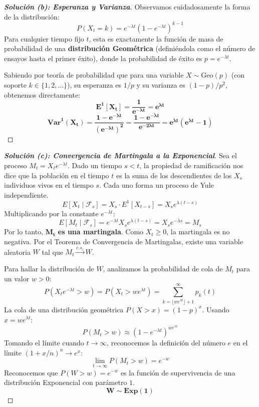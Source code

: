 \documentclass[10pt,a4paper]{article}
\begin{document}
\begin{proof}[\textbf{Solución (b): Esperanza y Varianza}]
    Observamos cuidadosamente la forma de la distribución:
    \[ P(X_t = k) = e^{-\lambda t}(1 - e^{-\lambda t})^{k-1} \]
    Para cualquier tiempo fijo $t$, esta es exactamente la función de masa de probabilidad de una \textbf{distribución Geométrica} (definiéndola como el número de ensayos hasta el primer éxito), donde la probabilidad de éxito es $p = e^{-\lambda t}$.
    
    Sabiendo por teoría de probabilidad que para una variable $X \sim \text{Geo}(p)$ (con soporte $k \in \{1, 2, \dots\}$), su esperanza es $1/p$ y su varianza es $(1-p)/p^2$, obtenemos directamente:
    \[ \mathbf{E^1[X_t] = \frac{1}{e^{-\lambda t}} = e^{\lambda t}} \]
    \[ \mathbf{\text{Var}^1(X_t) = \frac{1 - e^{-\lambda t}}{(e^{-\lambda t})^2} = \frac{1 - e^{-\lambda t}}{e^{-2\lambda t}} = e^{\lambda t}(e^{\lambda t} - 1)} \]
\end{proof}

\vspace{5mm}

\begin{proof}[\textbf{Solución (c): Convergencia de Martingala a la Exponencial}]
    Sea el proceso $M_t = X_t e^{-\lambda t}$.
    Dado un tiempo $s < t$, la propiedad de ramificación nos dice que la población en el tiempo $t$ es la suma de los descendientes de los $X_s$ individuos vivos en el tiempo $s$. Cada uno forma un proceso de Yule independiente.
    \[ E[X_t \mid \mathcal{F}_s] = X_s \cdot E^1[X_{t-s}] = X_s e^{\lambda(t-s)} \]
    Multiplicando por la constante $e^{-\lambda t}$:
    \[ E[M_t \mid \mathcal{F}_s] = e^{-\lambda t} X_s e^{\lambda(t-s)} = X_s e^{-\lambda s} = M_s \]
    Por lo tanto, $\mathbf{M_t}$ \textbf{es una martingala}. Como $X_t \ge 0$, la martingala es no negativa. Por el Teorema de Convergencia de Martingalas, existe una variable aleatoria $W$ tal que $M_t \xrightarrow{c.s.} W$.
    
    Para hallar la distribución de $W$, analizamos la probabilidad de cola de $M_t$ para un valor $w > 0$:
    \[ P(X_t e^{-\lambda t} > w) = P(X_t > w e^{\lambda t}) = \sum_{k = \lfloor w e^{\lambda t} \rfloor + 1}^\infty p_k(t) \]
    La cola de una distribución geométrica $P(X > x) = (1-p)^x$. Usando $x = w e^{\lambda t}$:
    \[ P(M_t > w) \approx (1 - e^{-\lambda t})^{w e^{\lambda t}} \]
    Tomando el límite cuando $t \to \infty$, reconocemos la definición del número $e$ en el límite $(1 + x/n)^n \to e^x$:
    \[ \lim_{t \to \infty} P(M_t > w) = e^{-w} \]
    Reconocemos que $P(W > w) = e^{-w}$ es la función de supervivencia de una distribución Exponencial con parámetro $1$.
    \[ \mathbf{W \sim \text{Exp}(1)} \]
\end{proof}
\end{document}
